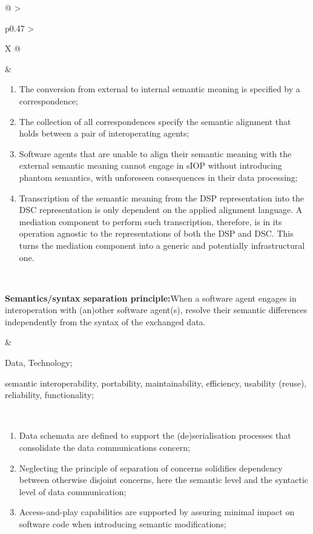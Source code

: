 \begin{xltabular}[l]{\linewidth}{@{} >{\small\raggedright\arraybackslash}p{0.47\linewidth} >{\small\raggedright\arraybackslash}X @{}}
\begin{enumerate}[left=6pt, nosep]
\end{enumerate}
&
\begin{enumerate}[left=10pt, nosep]
  \item The conversion from external to internal semantic meaning is specified by a correspondence;
  \item The collection of all correspondences specify the semantic alignment that holds between a pair of interoperating agents;
  \item Software agents that are unable to align their semantic meaning with the external semantic meaning cannot engage in sIOP without introducing phantom semantics, with unforeseen consequences in their data processing;
  \item Transcription of the semantic meaning from the DSP representation into the DSC representation is only dependent on the applied alignment language. A mediation component to perform such transcription, therefore, is in its operation agnostic to the representations of both the DSP and DSC. This turns the mediation component into a generic and potentially infrastructural one.
\end{enumerate} \\
%
%
%
\begin{mmdp}\label{dp:ssoc}{\bfseries Semantics/syntax separation principle:}\quad When a software agent engages in interoperation with (an)other software agent(s), resolve their semantic differences independently from the syntax of the exchanged data. \end{mmdp}
&
\begin{description}[labelwidth=3.7cm,leftmargin=3.7cm+1ex,nosep,topsep=2ex,labelsep=1ex,font=\bfseries]
\item[Type of information:] Data, Technology;
\item[Quality attributes:] semantic interoperability, portability, maintainability, efficiency, usability (reuse), reliability, functionality;
\end{description}
\\
\begin{enumerate}[left=6pt, nosep]
  \item Data schemata are defined to support the (de)serialisation processes that consolidate the data communications concern;
  \item Neglecting the principle of separation of concerns solidifies dependency between otherwise disjoint concerns, here the semantic level and the syntactic level of data communication;
  \item Access-and-play capabilities are supported by assuring minimal impact on software code when introducing semantic modifications;

\end{enumerate}
\end{xltabular}

